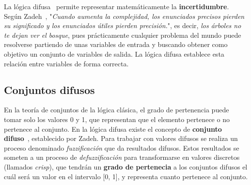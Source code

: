 La lógica difusa~\cite{Morc11} permite representar matemáticamente la \textbf{incertidumbre}. Según Zadeh~\cite{Zad73}, "\textit{Cuando aumenta la complejidad, los enunciados precisos pierden su significado y los enunciados útiles pierden precisión.}", es decir, \textit{los árboles no te dejan ver el bosque}, pues prácticamente cualquier problema del mundo puede resolverse partiendo de unas variables de entrada y buscando obtener como objetivo un conjunto de variables de salida. La lógica difusa establece esta relación entre variables de forma correcta.

\subsection{Conjuntos difusos}
En la teoría de conjuntos de la lógica clásica, el grado de pertenencia puede tomar solo los valores 0 y 1, que representan que el elemento pertenece o no pertenece al conjunto. En la lógica difusa existe el concepto de \textbf{conjunto difuso}~\cite{Zad65}, establecido por Zadeh. Para trabajar con valores difusos se realiza un proceso denominado \textit{fuzzificación} que da resultados difusos. Estos resultados se someten a un proceso de \textit{defuzzificación} para transformarse en valores discretos (llamados \textit{crisp}), que tendrán un \textbf{grado de pertenecia} a los conjuntos difusos el cuál será un valor en el intervalo [0, 1], y representa cuanto pertenece al conjunto.\\

